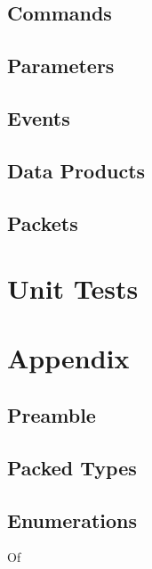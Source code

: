 \subsection{Commands}



\subsection{Parameters}



\subsection{Events}



\subsection{Data Products}



\subsection{Packets}



\section{Unit Tests}



\section{Appendix}

\subsection{Preamble}



\subsection{Packed Types}



\subsection{Enumerations}

 Of


